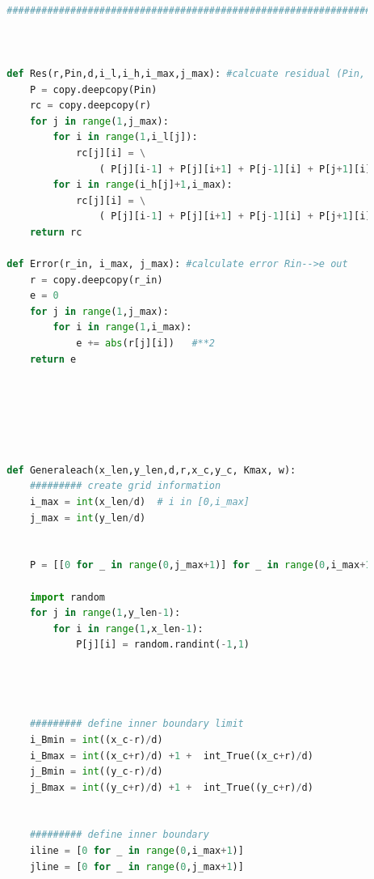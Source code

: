 \documentclass[12pt]{article}
\begin{document}
\begin{scriptsize}
    \begin{lstlisting}[language=python,caption={Python code-Functions for Iteration Solver and Result Analysist}]
    
        ##########################################################################################
        
        
        
        def Res(r,Pin,d,i_l,i_h,i_max,j_max): #calcuate residual (Pin, source)-->Rout
            P = copy.deepcopy(Pin)
            rc = copy.deepcopy(r)
            for j in range(1,j_max):
                for i in range(1,i_l[j]): 
                    rc[j][i] = \
                        ( P[j][i-1] + P[j][i+1] + P[j-1][i] + P[j+1][i] - 4*P[j][i] ) 
                for i in range(i_h[j]+1,i_max): 
                    rc[j][i] = \
                        ( P[j][i-1] + P[j][i+1] + P[j-1][i] + P[j+1][i] - 4*P[j][i] ) 
            return rc
        
        def Error(r_in, i_max, j_max): #calculate error Rin-->e out
            r = copy.deepcopy(r_in)
            e = 0
            for j in range(1,j_max):
                for i in range(1,i_max): 
                    e += abs(r[j][i])   #**2
            return e
        
        
        
        
        
        
        def Generaleach(x_len,y_len,d,r,x_c,y_c, Kmax, w):
            ######### create grid information
            i_max = int(x_len/d)  # i in [0,i_max]
            j_max = int(y_len/d)
        
        
            P = [[0 for _ in range(0,j_max+1)] for _ in range(0,i_max+1)]
        
            import random
            for j in range(1,y_len-1):
                for i in range(1,x_len-1):
                    P[j][i] = random.randint(-1,1)
        
        
        
        
            ######### define inner boundary limit
            i_Bmin = int((x_c-r)/d)
            i_Bmax = int((x_c+r)/d) +1 +  int_True((x_c+r)/d)
            j_Bmin = int((y_c-r)/d)
            j_Bmax = int((y_c+r)/d) +1 +  int_True((y_c+r)/d)
        
        
            ######### define inner boundary
            iline = [0 for _ in range(0,i_max+1)]
            jline = [0 for _ in range(0,j_max+1)]
        

\end{lstlisting}
\end{scriptsize}
\end{document}
